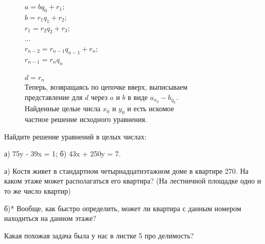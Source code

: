 \begin{figure}[H]
    \centering
        \begin{minipage}{0.3\linewidth}
            $a = bq_0 + r_1;$
            \\
            $b = r_1q_1 + r_2;$
            \\
            $r_1 = r_2q_2 + r_3;$
            \\
            $...$
            \\
            $r_{n - 2} = r_{n - 1}q_{n - 1} + r_n;$
            \\
            $r_{n - 1} = r_nq_n$
        \end{minipage}
        \begin{minipage}{0.5\linewidth}
            $d = r_n$
            \\
            Теперь, возвращаясь по цепочке вверх, выписываем
            \\
            представление для $d$ через $a$ и $b$ в виде $a_{x_0} - b_{y_0}$.
            \\
            Найденные целые числа $x_0$ и $y_0$ и есть искомое
            \\
            частное решение исходного уравнения.
            \\

        \end{minipage}
\end{figure}

\begin{thm}
    Найдите решение уравнений в целых числах:
    \par а) 75y - 39x = 1; б) 43x + 250y = 7.
\end{thm}

\begin{thm}
    а) Костя живет в стандартном четырнадцатиэтажном доме в квартире 270. На каком этаже может располагаться его квартира? (На лестничной площадке одно и то же число квартир) 
    \par б)* Вообще, как быстро определить, может ли квартира с данным номером находиться на данном этаже?
\end{thm}

\begin{ques}
    Какая похожая задача была у нас в листке 5 про делимость?
\end{ques}